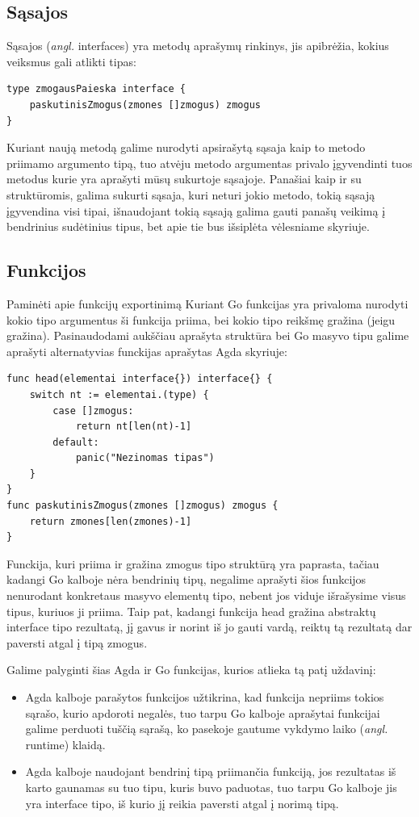 \documentclass{VUMIFPSkursinis}
\begin{document}
\subsection{Sąsajos}
Sąsajos (\textit{angl.} interfaces) yra metodų aprašymų rinkinys, jis apibrėžia, kokius veiksmus gali atlikti tipas:
\begin{lstlisting}[language=GoCust]
type zmogausPaieska interface {
	paskutinisZmogus(zmones []zmogus) zmogus
}
\end{lstlisting}
Kuriant naują metodą galime nurodyti apsirašytą sąsaja kaip to metodo priimamo argumento tipą, tuo atvėju metodo argumentas privalo įgyvendinti tuos metodus kurie yra aprašyti mūsų sukurtoje sąsajoje. Panašiai kaip ir su struktūromis, galima sukurti sąsaja, kuri neturi jokio metodo, tokią sąsają įgyvendina visi tipai, išnaudojant tokią sąsają galima gauti panašų veikimą į bendrinius sudėtinius tipus, bet apie tie bus išsiplėta vėlesniame skyriuje.
\subsection{Funkcijos}
Paminėti apie funkcijų exportinimą
Kuriant Go funkcijas yra privaloma nurodyti kokio tipo argumentus ši funkcija priima, bei kokio tipo reikšmę gražina (jeigu gražina). Pasinaudodami aukščiau aprašyta struktūra bei Go masyvo tipu galime aprašyti alternatyvias funckijas aprašytas Agda skyriuje:
\begin{lstlisting}[language=GoCust]
func head(elementai interface{}) interface{} {
	switch nt := elementai.(type) {
		case []zmogus:
			return nt[len(nt)-1]
		default:
			panic("Nezinomas tipas")
	}
}
func paskutinisZmogus(zmones []zmogus) zmogus {
	return zmones[len(zmones)-1]
}
\end{lstlisting}
Funckija, kuri priima ir gražina zmogus tipo struktūrą yra paprasta, tačiau kadangi Go kalboje nėra bendrinių tipų, negalime aprašyti šios funkcijos nenurodant konkretaus masyvo elementų tipo, nebent jos viduje išrašysime visus tipus, kuriuos ji priima. Taip pat, kadangi funkcija head gražina abstraktų interface{} tipo rezultatą, jį gavus ir norint iš jo gauti vardą, reiktų tą rezultatą dar paversti atgal į tipą zmogus. \par Galime palyginti šias Agda ir Go funkcijas, kurios atlieka tą patį uždavinį:
\begin{itemize}
	\item Agda kalboje parašytos funkcijos užtikrina, kad funkcija nepriims tokios sąrašo, kurio apdoroti negalės, tuo tarpu Go kalboje aprašytai funkcijai galime perduoti tuščią sąrašą, ko pasekoje gautume vykdymo laiko (\textit{angl.} runtime) klaidą.
	\item Agda kalboje naudojant bendrinį tipą priimančia funkciją, jos rezultatas iš karto gaunamas su tuo tipu, kuris buvo paduotas, tuo tarpu Go kalboje jis yra interface tipo, iš kurio jį reikia paversti atgal į norimą tipą.
\end{itemize}
\end{document}
